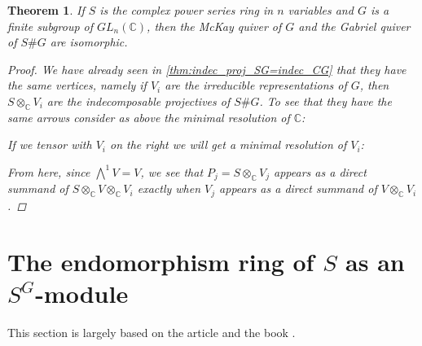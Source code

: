 \documentclass[11pt, a4paper, english]{article}
\newtheorem{theorem}{Theorem}[section]
\theoremstyle{definition}
\newcommand{\C}{\mathbb{C}}
\begin{document}
\begin{theorem}
\label{thm:gabriel_equals_mckay}
If $S$ is the complex power series ring in $n$ variables and $G$ is a finite subgroup of $GL_n(\C)$, then the McKay quiver of $G$ and the Gabriel quiver of $S\#G$ are isomorphic.
\begin{proof}
We have already seen in \cref{thm:indec_proj_SG=indec_CG} that they have the same vertices, namely if $V_i$ are the irreducible representations of $G$, then $S \otimes_\C V_i$ are the indecomposable projectives of $S\#G$. To see that they have the same arrows consider as above the minimal resolution of $\C$:
\begin{center}
\end{center}
If we tensor with $V_i$ on the right we will get a minimal resolution of $V_i$:
\begin{center}
\end{center}
From here, since $\bigwedge\limits^{1} V = V$, we see that $P_j = S \otimes_\C V_j$ appears as a direct summand of $S \otimes_\C V \otimes_\C V_i$ exactly when $V_j$ appears as a direct summand of $V \otimes_\C V_i$.
\end{proof}
\end{theorem}

\section{The endomorphism ring of $S$ as an $S^G$-module}
This section is largely based on the article \cite{IyTa} and the book \cite{LW12}.
\end{document}
